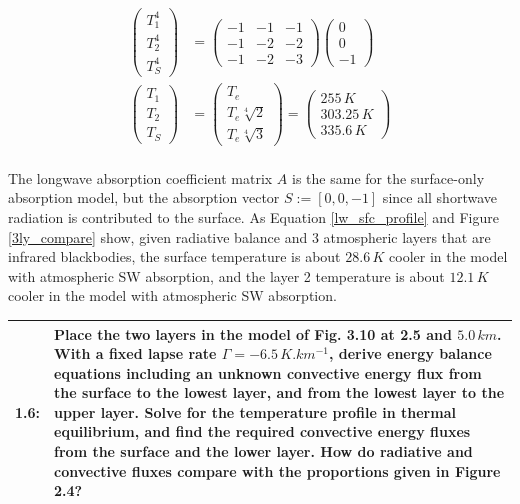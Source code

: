 \documentclass[12pt]{article}
\newcommand*{\problem}[2]{
    \begin{table}[ht]
    \centering
        \begin{tabular}{ | p{.1\linewidth} p{.9\linewidth} | }
            \hline
            \vspace{.3em}\textbf{\large#1:} & \vspace{.3em}\small{#2}\hspace{.2em}\vspace{.5em} \\ \hline
        \end{tabular}
    \end{table}
}
\begin{document}
\begin{equation}\label{lw_sfc_profile}
    \begin{split}
        \begin{pmatrix} T_1^4 \\ T_2^4 \\ T_S^4 \end{pmatrix}
        &= \begin{pmatrix} -1 & -1 & -1 \\ -1 & -2 & -2 \\ -1 & -2 & -3 \end{pmatrix} \begin{pmatrix} 0 \\ 0 \\ -1 \end{pmatrix} \\
        \begin{pmatrix} T_1 \\ T_2 \\ T_S \end{pmatrix}
        &= \begin{pmatrix} T_e \\ T_e\sqrt[4]{2} \\ T_e\sqrt[4]{3}\end{pmatrix}
            = \begin{pmatrix} 255\,\si{K} \\ 303.25\,\si{K} \\ 335.6\,\si{K} \end{pmatrix} \\
    \end{split}
\end{equation}

The longwave absorption coefficient matrix $A$ is the same for the surface-only absorption model, but the absorption vector $S := [0,0,-1]$
since all shortwave radiation is contributed to the surface. As Equation \ref{lw_sfc_profile} and Figure \ref{3ly_compare} show, given radiative balance
and 3 atmospheric layers that are infrared blackbodies, the surface temperature is about $28.6\,\si{K}$ cooler in the model with atmospheric SW absorption,
and the layer 2 temperature is about $12.1\,\si{K}$ cooler in the model with atmospheric SW absorption.

\problem{1.6}{
    Place the two layers in the model of Fig. 3.10 at 2.5 and $5.0\,\si{km}$. With a fixed lapse rate $\Gamma = -6.5\,\si{K.km^{-1}}$,
    derive energy balance equations including an unknown convective energy flux from the surface to the lowest layer, and from the lowest layer to the upper layer.
    Solve for the temperature profile in thermal equilibrium, and find the required convective energy fluxes from the surface and the lower layer.
    How do radiative and convective fluxes compare with the proportions given in Figure 2.4?
}
\end{document}
